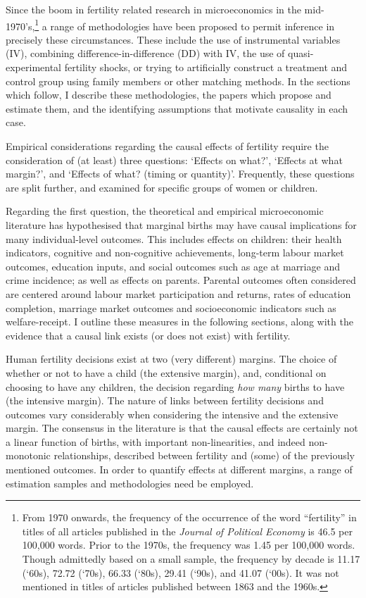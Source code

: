 Since the boom in fertility related research in microeconomics in the mid-%
1970's,\footnote{From 1970 onwards, the frequency of the occurrence of the word 
``fertility'' 
in titles of all articles published in the \emph{Journal of Political Economy} 
is 46.5 per 100,000 words. Prior to the 1970s, the frequency was 1.45 per 
100,000 words. Though admittedly based on a small sample, the frequency by 
decade is 11.17 (`60s), 72.72 (`70s), 66.33 (`80s), 29.41 (`90s), and 41.07 
(`00s). It was not mentioned in titles of articles published between 1863 and 
the 1960s.} a range of methodologies have been proposed to permit inference 
in precisely these circumstances. These include the use of instrumental 
variables (IV), combining difference-in-difference (DD) with IV, the use of 
quasi-experimental fertility shocks, or trying to artificially construct a 
treatment and control group using family members or other matching 
methods.  In the sections which follow, I describe these methodologies, the 
papers which propose and estimate them, and the identifying assumptions that
motivate causality in each case.

Empirical considerations regarding the causal effects of fertility require the
consideration of (at least) three questions: `Effects on what?', `Effects at
what margin?', and `Effects of what? (timing or quantity)'.  Frequently, these 
questions are split further, and examined for specific groups of women or 
children.

Regarding the first question, the theoretical and empirical microeconomic 
literature has hypothesised that marginal births may have causal implications 
for many individual-level outcomes.  This includes effects on children: their 
health indicators, cognitive and non-cognitive achievements, long-term labour 
market outcomes, education inputs, and social outcomes such as age at marriage 
and crime incidence; as well as effects on parents. Parental outcomes often 
considered are centered around labour market participation and returns, rates 
of education completion, marriage market outcomes and socioeconomic indicators 
such as welfare-receipt.  I outline these measures in the following sections, 
along with the evidence that a causal link exists (or does not exist) with 
fertility.

Human fertility decisions exist at two (very different) margins.  The choice of
whether or not to have a child (the extensive margin), and, conditional on 
choosing to have any children, the decision regarding \emph{how many} births
to have (the intensive margin).  The nature of links between fertility decisions
and outcomes vary considerably when considering the intensive and the extensive
margin.  The consensus in the literature is that the causal effects are 
certainly not a linear function of births, with important non-linearities, and 
indeed non-monotonic relationships, described between fertility and (some) of 
the previously mentioned outcomes. In order to quantify effects at different 
margins, a range of estimation samples and methodologies need be employed.  

